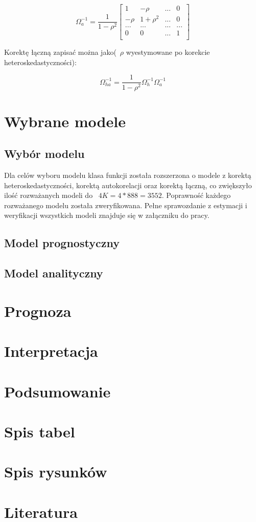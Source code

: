 \documentclass{article}
\begin{document}
\begin{equation*}
    \Omega_{a}^{-1}=\frac{1}{1-\rho^2}
    \begin{bmatrix}
        1 & -\rho & ... & 0 \\
        -\rho & 1 + \rho^2 & ... & 0 \\
        ... & ... & ... & ... \\
        0 & 0 & ... & 1 \\
    \end{bmatrix}
\end{equation*}

Korektę łączną zapisać można jako(~$\rho$ wyestymowane po korekcie heteroskedastyczności):

\[\Omega_{ha}^{-1}=\frac{1}{1-\rho^2}\Omega_h^{-1}\Omega_a^{-1}\]

\newpage
\section{Wybrane modele}
\subsection{Wybór modelu}
Dla celów wyboru modelu klasa funkcji została rozszerzona o modele z korektą heteroskedastyczności, korektą autokorelacji oraz korektą łączną, co zwiększyło ilość rozważanych modeli do ~$4K=4*888=3552$. Poprawność każdego rozważanego modelu została zweryfikowana. Pełne sprawozdanie z estymacji i weryfikacji wszystkich modeli znajduje się w załączniku do pracy.

\subsection{Model prognostyczny}

\subsection{Model analityczny}


\section{Prognoza}

\section{Interpretacja}

\section{Podsumowanie}

\newpage
\section{Spis tabel}
\renewcommand\listtablename{}
\listoftables


\newpage
\section{Spis rysunków}
\renewcommand\listfigurename{}
\listoffigures


\newpage
\section{Literatura}
\printbibliography[heading=none]
\end{document}
